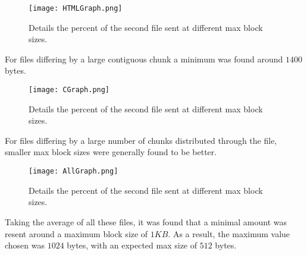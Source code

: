 \begin{figure}[H] \centering
\texttt{[image: HTMLGraph.png]}
\caption{Details the percent of the second file sent at different max block sizes.}
\end{figure}
\noindent
For files differing by a large contiguous chunk a minimum was found around $1400$ bytes.

\begin{figure}[H] \centering
\texttt{[image: CGraph.png]}
\caption{Details the percent of the second file sent at different max block sizes.}
\end{figure}
\noindent
For files differing by a large number of chunks distributed through the file, smaller max block sizes were generally found to be better.


\begin{figure}[H] \centering
\texttt{[image: AllGraph.png]}
\caption{Details the percent of the second file sent at different max block sizes.}
\end{figure}
\noindent
Taking the average of all these files, it was found that a minimal amount was resent around a maximum block size of $1 KB$. As a result, the maximum value chosen was $1024$ bytes, with an expected max size of $512$ bytes.
